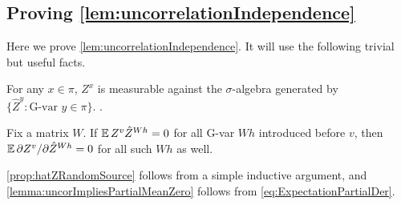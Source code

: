 \documentclass[main.tex]{subfiles}
\begin{document}
\subsection{Proving \texorpdfstring{\cref{lem:uncorrelationIndependence}}{Key Lemma}}

Here we prove \cref{lem:uncorrelationIndependence}.
It will use the following trivial but useful facts.
\begin{prop}
    \label{prop:hatZRandomSource}For any $x\in\pi$, $Z^{x}$ is measurable against the $\sigma$-algebra generated by $\{\hat{Z}^{y}:\text{G-var }y\in\pi\}$.
    .
\end{prop}
    
\begin{lemma}
    \label{lemma:uncorImpliesPartialMeanZero}Fix a matrix $W$. If $\operatorname*{\mathbb{E}} Z^{v}\hat{Z}^{Wh}=0$ for all G-var $Wh$ introduced before $v$, then $\operatorname*{\mathbb{E}}\partial Z^{v}/\partial\hat{Z}^{Wh}=0$ for all such $Wh$ as well.
    
\end{lemma}
\cref{prop:hatZRandomSource} follows from a simple inductive argument, and \cref{lemma:uncorImpliesPartialMeanZero} follows from \cref{eq:ExpectationPartialDer}.
\end{document}
